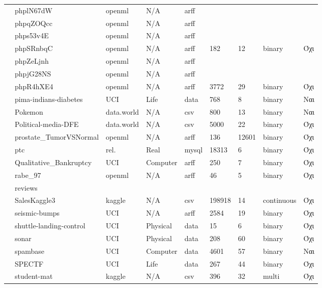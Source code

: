 {\begin{longtable}{|l| l| l | l | l | l |l | l | l | }
 			\rownumber & phplN67dW & openml & N/A & arff & & & & \\
 			\rownumber & phpqZOQcc & openml & N/A & arff & & & & \\
 			\rownumber & phps53v4E & openml & N/A & arff & & & & \\
 			\rownumber & phpSRnbqC \citep{planning} & openml & N/A & arff & 182 & 12 & binary & Όχι \\
 			\rownumber & phpZeLjnh & openml & N/A & arff & & & & \\
 			\rownumber & phpjG28NS & openml & N/A & arff & & & & \\
 			\rownumber & phpR4hXE4 & openml & N/A & arff & 3772 & 29 & binary & Όχι \\
 			\rownumber & pima-indians-diabetes \citep{pima} & UCI & Life & data & 768 & 8 & binary & Ναι \\
 			\rownumber & Pokemon & data.world& N/A& csv & 800 & 13 & binary& Ναι\\
 			\rownumber & Political-media-DFE & data.world & N/A & csv & 5000 & 22  & binary& Όχι \\
 			\rownumber & prostate\_TumorVSNormal & openml & N/A & arff & 136 & 12601  & binary & Όχι \\
 			\rownumber & ptc \citep{Helma2001} & rel.& Real  & mysql & 18313 & 6 & binary & Όχι \\
 			\rownumber & Qualitative\_Bankruptcy \citep{bankruptcy} & UCI & Computer & arff & 250 & 7 & binary & Όχι \\
 			\rownumber & rabe\_97 \citep{rabe} & openml & N/A & arff & 46 & 5 & binary & Όχι \\
 			\rownumber & reviews & & & & & & & \\
 			\rownumber & SalesKaggle3 \citep{sales} & kaggle & N/A & csv & 198918 & 14 & continuous & Όχι \\
 			\rownumber & seismic-bumps \citep{seismic} & UCI & N/A & arff & 2584 & 19& binary & Όχι \\
 			\rownumber & shuttle-landing-control \citep{shuttle} & UCI & Physical & data & 15  & 6 & binary &  Όχι \\
 				\rownumber & sonar & UCI & Physical & data & 208 & 60 & binary  & Όχι \\
 				\rownumber & spambase \citep{spam} & UCI & Computer & data & 4601 & 57 & binary & Ναι  \\
 				\rownumber & SPECTF \citep{spectf} & UCI & Life & data & 267 & 44 & binary & Όχι \\
 				\rownumber & student-mat \citep{alcohol} & kaggle & N/A & csv & 396 & 32 & multi & Όχι \\

\end{longtable}}
